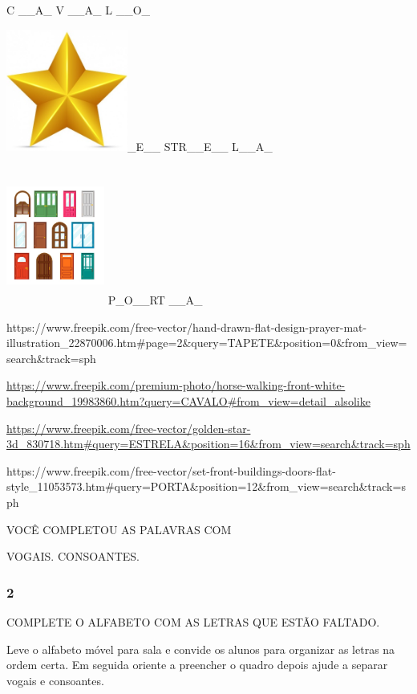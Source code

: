 C \_\_A\_ V \_\_A\_ L \_\_O\_

\includegraphics[width=1.57292in,height=1.57292in]{media/image3.jpeg}\_E\_\_
STR\_\_E\_\_ L\_\_A\_

\includegraphics[width=1.27083in,height=1.80035in]{media/image4.jpeg}
P\_O\_\_RT \_\_A\_

https://www.freepik.com/free-vector/hand-drawn-flat-design-prayer-mat-illustration\_22870006.htm\#page=2\&query=TAPETE\&position=0\&from\_view=search\&track=sph

\url{https://www.freepik.com/premium-photo/horse-walking-front-white-background_19983860.htm?query=CAVALO\#from_view=detail_alsolike}

\url{https://www.freepik.com/free-vector/golden-star-3d_830718.htm\#query=ESTRELA\&position=16\&from_view=search\&track=sph}

https://www.freepik.com/free-vector/set-front-buildings-doors-flat-style\_11053573.htm\#query=PORTA\&position=12\&from\_view=search\&track=sph

VOCÊ COMPLETOU AS PALAVRAS COM

VOGAIS. CONSOANTES.

\subsubsection{2 }\label{section-1}

COMPLETE O ALFABETO COM AS LETRAS QUE ESTÃO FALTADO.

Leve o alfabeto móvel para sala e convide os alunos para organizar as
letras na ordem certa. Em seguida oriente a preencher o quadro depois
ajude a separar vogais e consoantes.

